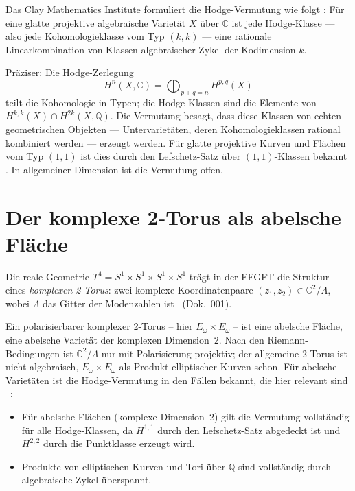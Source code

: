 Das Clay Mathematics Institute formuliert die Hodge-Vermutung wie folgt
\QM: Für eine glatte projektive algebraische Varietät $X$ über $\mathbb{C}$
ist jede Hodge-Klasse — also jede Kohomologieklasse vom Typ $(k,k)$ — eine
rationale Linearkombination von Klassen algebraischer Zykel der Kodimension $k$.

Präziser: Die Hodge-Zerlegung
\[
H^n(X,\mathbb{C}) = \bigoplus_{p+q=n} H^{p,q}(X)
\]
teilt die Kohomologie in Typen; die Hodge-Klassen sind die Elemente von
$H^{k,k}(X) \cap H^{2k}(X,\mathbb{Q})$. Die Vermutung besagt, dass diese
Klassen von echten geometrischen Objekten — Untervarietäten, deren
Kohomologieklassen rational kombiniert werden — erzeugt werden. Für glatte
projektive Kurven und Flächen vom Typ $(1,1)$ ist dies durch den
Lefschetz-Satz über $(1,1)$-Klassen bekannt \EM. In allgemeiner Dimension
ist die Vermutung offen.

\section{Der komplexe 2-Torus als abelsche Fläche}

Die reale Geometrie $T^4 = S^1 \times S^1 \times S^1 \times S^1$ trägt in
der FFGFT die Struktur eines \emph{komplexen 2-Torus}: zwei komplexe
Koordinatenpaare $(z_1, z_2) \in \mathbb{C}^2 / \Lambda$, wobei $\Lambda$
das Gitter der Modenzahlen ist \SetzM\ (Dok.~001).

Ein polarisierbarer komplexer 2-Torus -- hier $E_\omega\times E_\omega$ -- ist
eine abelsche Fläche, eine abelsche Varietät der komplexen Dimension~2.
Nach den Riemann-Bedingungen ist $\mathbb{C}^2/\Lambda$ nur mit Polarisierung
projektiv; der allgemeine 2-Torus ist nicht algebraisch, $E_\omega\times E_\omega$
als Produkt elliptischer Kurven schon. Für abelsche Varietäten ist die Hodge-Vermutung in
den Fällen bekannt, die hier relevant sind \EM\ \QM:
\begin{itemize}
\item Für abelsche Flächen (komplexe Dimension~2) gilt die Vermutung vollständig
      für alle Hodge-Klassen, da $H^{1,1}$ durch den Lefschetz-Satz abgedeckt
      ist und $H^{2,2}$ durch die Punktklasse erzeugt wird.
\item Produkte von elliptischen Kurven und Tori über $\mathbb{Q}$ sind
      vollständig durch algebraische Zykel überspannt.
\end{itemize}

